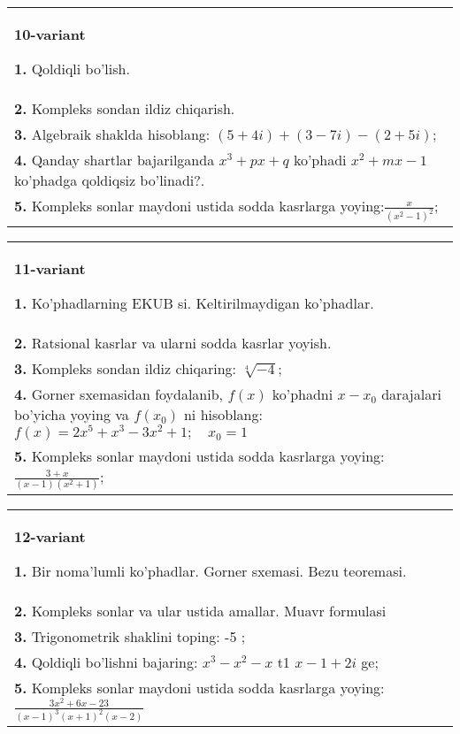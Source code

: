 \documentclass{article}
\begin{document}
\begin{tabular}{m{17cm}}
\textbf{10-variant}
\newline

\textbf{1.} Qoldiqli bo’lish.  \\
\textbf{2.} Kompleks sondan ildiz chiqarish. \\
\textbf{3.} Algebraik shaklda hisoblang: $(5+4 i)+(3-7 i)-(2+5 i)$; \\
\textbf{4.} Qanday shartlar bajarilganda $x^3+p x+q$ ko’phadi $x^2+m x-1$ ko’phadga qoldiqsiz bo’linadi?. \\
\textbf{5.} Kompleks sonlar maydoni ustida sodda kasrlarga yoying:$\frac{x}{\left(x^2-1\right)^2}$; \\

\end{tabular}
\vspace{1cm}


\begin{tabular}{m{17cm}}
\textbf{11-variant}
\newline

\textbf{1.} Ko’phadlarning EKUB si. Keltirilmaydigan ko’phadlar. \\
\textbf{2.} Ratsional kasrlar va ularni sodda kasrlar yoyish. \\
\textbf{3.} Kompleks sondan ildiz chiqaring: $\sqrt[4]{-4}$; \\
\textbf{4.} Gorner sxemasidan foydalanib, $f(x)$ ko’phadni $x-x_0$ darajalari bo’yicha yoying va $f\left(x_0\right)$ ni hisoblang:  $f(x)=2 x^5+x^3-3 x^2+1 ; \quad x_0=1$ \\
\textbf{5.} Kompleks sonlar maydoni ustida sodda kasrlarga yoying:$\frac{3+x}{(x-1)\left(x^2+1\right)}$; \\

\end{tabular}
\vspace{1cm}


\begin{tabular}{m{17cm}}
\textbf{12-variant}
\newline

\textbf{1.} Bir noma’lumli ko’phadlar. Gorner sxemasi. Bezu teoremasi.  \\
\textbf{2.} Kompleks sonlar va ular ustida amallar. Muavr formulasi  \\
\textbf{3.} Trigonometrik shaklini toping: -5 ;  \\
\textbf{4.} Qoldiqli bo’lishni bajaring:  $x^3-x^2-x$ t1 $x-1+2 i$ ge; \\
\textbf{5.} Kompleks sonlar maydoni ustida sodda kasrlarga yoying:$\frac{3 x^2+6 x-23}{(x-1)^3(x+1)^2(x-2)}$ \\

\end{tabular}
\vspace{1cm}
\end{document}
